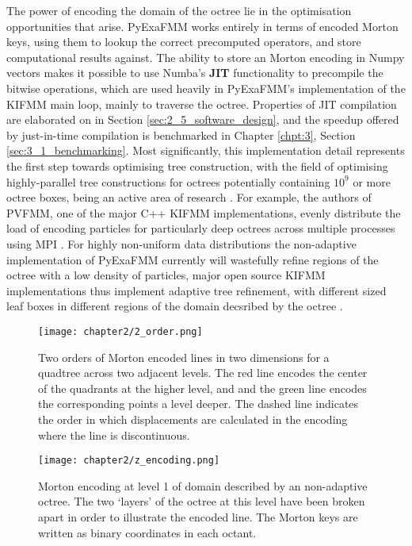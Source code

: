 The power of encoding the domain of the octree lie in the optimisation opportunities
that arise. \gls{PyExaFMM} works entirely in terms of encoded Morton keys, using
them to lookup the correct precomputed operators, and store computational results against.
The ability to store an Morton encoding in Numpy vectors makes it possible to use
Numba's \textbf{\gls{JIT}} functionality to precompile the bitwise
operations, which are used heavily in \gls{PyExaFMM}'s implementation of the \gls{KIFMM}
main loop, mainly to traverse the octree. Properties of \gls{JIT} compilation are
elaborated on in Section \ref{sec:2_5_software_design}, and the speedup offered
by just-in-time compilation is benchmarked in Chapter \ref{chpt:3}, Section
\ref{sec:3_1_benchmarking}. Most significantly, this implementation detail
represents the first step towards optimising tree construction, with the
field of optimising highly-parallel tree constructions for octrees potentially containing
$10^9$ or more octree boxes, being an active area of research \cite{Sundar:2008:SIAM,Malhotra:2015:CCP}.
For example, the authors of PVFMM, one of the major C++ \gls{KIFMM} implementations,
evenly distribute the load of encoding particles for particularly deep octrees across
multiple processes using \gls{MPI} \cite{Malhotra:2015:CCP}. For highly non-uniform
data distributions the non-adaptive implementation of \gls{PyExaFMM} currently
will wastefully refine regions of the octree with a low density of particles, major
open source \gls{KIFMM} implementations thus implement adaptive tree refinement,
with different sized leaf boxes in different regions of the domain decsribed by
the octree \cite{Ying:2004:JCP, Malhotra:2015:CCP, exafmm}.

\begin{figure}[!h]
    \centering
    {\texttt{[image: chapter2/2\_order.png]}}
    \vspace{0pt}
    \caption{
        Two orders of Morton encoded lines in two dimensions for a quadtree across
        two adjacent levels. The red line encodes the center of the quadrants at the higher level,
        and and the green line encodes the corresponding points a level deeper.
        The dashed line indicates the order in which displacements are calculated
        in the encoding where the line is discontinuous.
    }
    \label{fig:2_2_multi_order}
\end{figure}


\begin{figure}[!h]
    \centering
    {\texttt{[image: chapter2/z\_encoding.png]}}
    \vspace{0pt}
    \caption{
        Morton encoding at level 1 of domain described by an non-adaptive octree.
        The two `layers' of the octree at this level have been broken apart
        in order to illustrate the encoded line. The Morton keys are written
        as binary coordinates in each octant.
    }
    \label{fig:2_2_morton_encoding}
\end{figure}